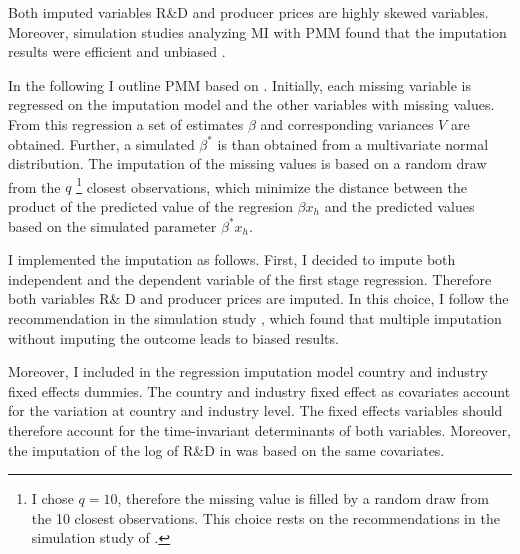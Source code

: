 Both imputed variables R\&D and producer prices are highly skewed variables.
Moreover, simulation studies analyzing MI with PMM  found that the imputation results were efficient and unbiased \textcite{Morris2014}.   \par
In the following I outline PMM based on \parencite{White_MI_chained}.
Initially, each missing variable is regressed on the imputation model and the other variables with missing values.
From this regression a set of estimates $\beta$ and corresponding variances $V$ are obtained.
 Further, a simulated $\beta^*$ is than obtained from a multivariate normal distribution.
The imputation of the missing values is based on a random draw from the $q$ \footnote{I chose $q= 10$, therefore the missing value is filled by a random draw from the 10 closest observations.
 This choice rests on the recommendations in the simulation study of \textcite{Morris2014}.} closest observations, which minimize the distance between the product of the predicted value of the regresion $\beta x_h$ and the predicted values based on the simulated parameter $\beta^* x_h$.
  \par
  I implemented the imputation as follows.
  First, I decided to impute both independent and the dependent variable of the first stage regression.
  Therefore both variables R\& D and producer prices are imputed.
  In this choice, I follow the recommendation in the simulation study \textcite{Moons:2006a}, which found that multiple imputation without imputing the outcome leads to biased results. \par
Moreover, I included in the regression imputation model country and industry fixed effects dummies.
The country and industry fixed effect as covariates account for the variation at country and industry level.
The fixed effects variables should therefore account for the time-invariant determinants of both variables.
Moreover, the imputation of the log of R\&D in \textcite{costinot} was based on the same covariates.
